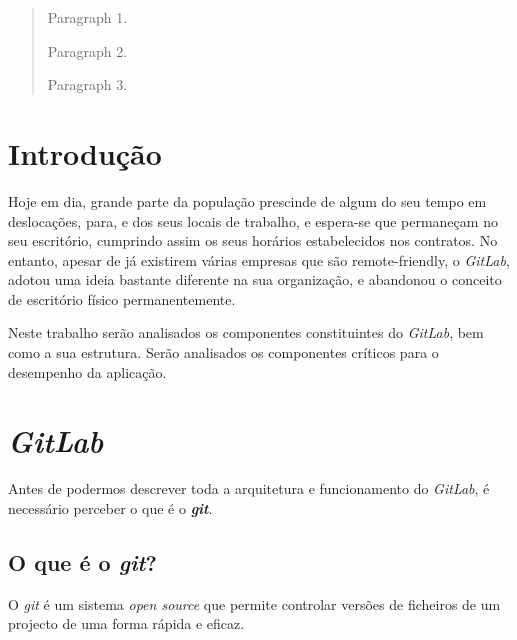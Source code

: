 \documentclass[12pt,a4paper]{article}
\begin{document}
\vspace*{\fill}
\begin{abstract}
Paragraph 1.

Paragraph 2.

Paragraph 3.
\end{abstract}
\vspace*{\fill}
\thispagestyle{empty}




\clearpage
\tableofcontents
\listoffigures
\clearpage




\setcounter{page}{1}
\section{Introdução}
Hoje em dia, grande parte da população prescinde de algum do seu tempo em deslocações, para, e dos seus locais de trabalho, e espera-se que permaneçam no seu escritório, cumprindo assim os seus horários estabelecidos nos contratos. No entanto, apesar de já existirem várias empresas que são remote-friendly, o \emph{GitLab}, adotou uma ideia bastante diferente na sua organização, e abandonou o conceito de escritório físico permanentemente.

Neste trabalho serão analisados os componentes constituintes do \emph{GitLab}, bem como a sua estrutura. Serão analisados os componentes críticos para o desempenho da aplicação.






\newpage
\section{\emph{GitLab}}
Antes de podermos descrever toda a arquitetura e funcionamento do \emph{GitLab}, é necessário perceber o que é o \emph{\textbf{git}}.

\subsection{O que é o \emph{git}?}
O \emph{git} é um sistema \emph{open source} que permite controlar versões de ficheiros de um projecto de uma forma rápida e eficaz.
\end{document}
